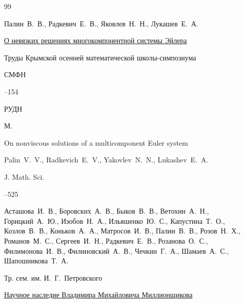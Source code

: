 \begin{thebibliography}{99}

\by Палин~В.~В., Радкевич~Е.~В., Яковлев~Н.~Н., Лукашев~Е.~А.

\paper \href{http://mi.mathnet.ru/cmfd263}{О невязких решениях многокомпонентной системы Эйлера}

\inbook Труды Крымской осенней математической школы-симпозиума

\serial СМФН



--154

\publ РУДН

\publaddr М.


\transl

\paper On nonviscous solutions of a multicomponent Euler system

\by  Palin~V.~V.,  Radkevich~E.~V.,  Yakovlev~N.~N., Lukashev~E.~A.

\jour J. Math. Sci.




--525








\by Асташова~И.~В., Боровских~А.~В., Быков~В.~В., Ветохин~А.~Н., Горицкий~А.~Ю., Изобов~Н.~А., Ильяшенко~Ю.~С., Капустина~Т.~О., Козлов~В.~В., Коньков~А.~А., Матросов~И.~В., Палин~В.~В., Розов~Н.~Х., Романов~М.~С., Сергеев~И.~Н., Радкевич~Е.~В., Розанова~О.~С., Филимонова~И.~В., Филиновский~А.~В., Чечкин~Г.~А., Шамаев~А.~С., Шапошникова~Т.~А. 

\serial Тр. сем. им. И.~Г.~Петровского

\paper \href{http://mi.mathnet.ru/tsp68}{Научное наследие Владимира Михайловича Миллионщикова}


\end{thebibliography}
